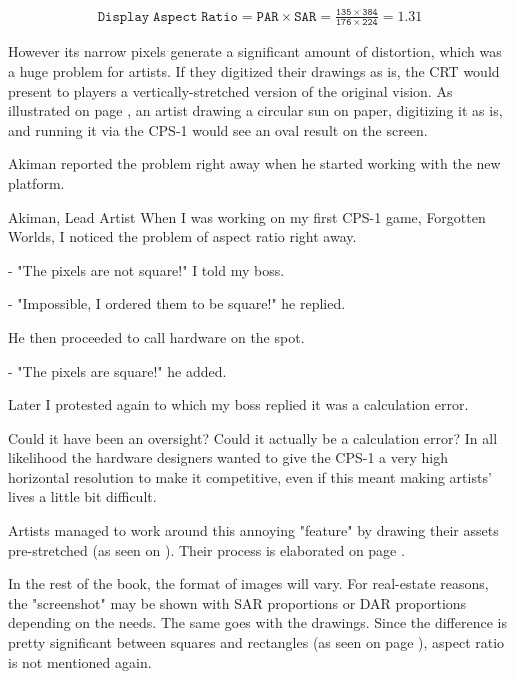 \begin{align*}
 \mathtt{Display\;Aspect\;Ratio = PAR \times SAR = \frac{135\times384}{176\times224} = 1.31}
\end{align*}

However its narrow pixels generate a significant amount of distortion, which was a huge problem for artists. If they digitized their drawings as is, the CRT would present to players a vertically-stretched version of the original vision. As illustrated on page \pageref{sf2_ratio}, an artist drawing a circular sun on paper, digitizing it as is, and running it via the CPS-1 would see an oval result on the screen.

Akiman reported the problem right away when he started working with the new platform.

\begin{q}{Akiman, Lead Artist\cite{akiman}}
When I was working on my first CPS-1 game, Forgotten Worlds, I noticed the problem of aspect ratio right away. 

- "The pixels are not square!" I told my boss.

- "Impossible, I ordered them to be square!" he replied.

He then proceeded to call hardware on the spot.

- "The pixels are square!" he added.

Later I protested again to which my boss replied it was a calculation error.
\end{q}

Could it have been an oversight? Could it actually be a calculation error? In all likelihood the hardware designers wanted to give the CPS-1 a very high horizontal resolution to make it competitive, even if this meant making artists' lives a little bit difficult.

Artists managed to work around this annoying "feature" by drawing their assets pre-stretched (as seen on \pageref{sf2_ratio_solution}). Their process is elaborated on page \pageref{artists_par}.
 
In the rest of the book, the format of images will vary. For real-estate reasons, the "screenshot" may be shown with SAR proportions or DAR proportions depending on the needs. The same goes with the drawings. Since the difference is pretty significant between squares and rectangles (as seen on page \pageref{sf2_ratio_solution}), aspect ratio is not mentioned again.

\pagebreak

\label{sf2_ratio}
\vfill
{}

